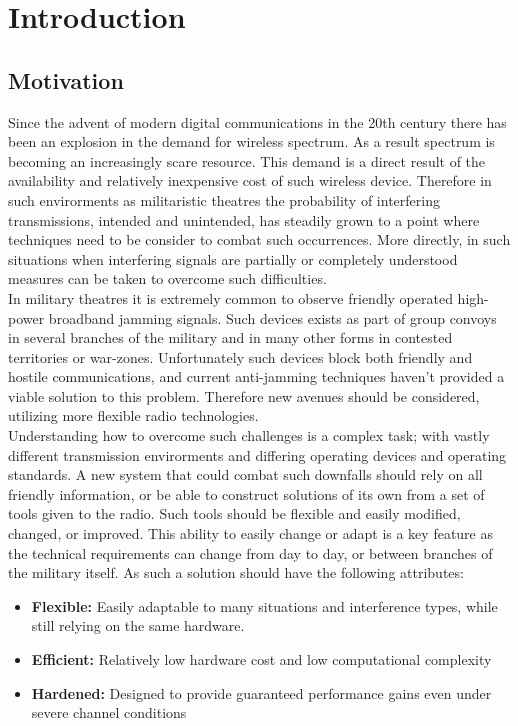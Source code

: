 \chapter{Introduction}
\label{ch:introduction}
\section{Motivation}

Since the advent of modern digital communications in the 20th century there has been an explosion in the demand for wireless spectrum.  As a result spectrum is becoming an increasingly scare resource\cite{scarcity}.  This demand is a direct result of the availability and relatively inexpensive cost of such wireless device.  Therefore in such envirorments as militaristic theatres the probability of interfering transmissions, intended and unintended, has steadily grown to a point where techniques need to be consider to combat such occurrences.  More directly, in such situations when interfering signals are partially or completely understood measures can be taken to overcome such difficulties.\\

In military theatres it is extremely common to observe friendly operated high-power broadband jamming signals\cite{frater}.  Such devices exists as part of group convoys in several branches of the military and in many other forms in contested territories or war-zones.  Unfortunately such devices block both friendly and hostile communications, and current anti-jamming techniques haven't provided a viable solution to this problem.  Therefore new avenues should be considered, utilizing more flexible radio technologies.\\

Understanding how to overcome such challenges is a complex task; with vastly different transmission envirorments and differing operating devices and operating standards.  A new system that could combat such downfalls should rely on all friendly information, or be able to construct solutions of its own from a set of tools given to the radio.  Such tools should be flexible and easily modified, changed, or improved.  This ability to easily change or adapt is a key feature as the technical requirements can change from day to day, or between branches of the military itself. As such a solution should have the following attributes:

\begin{itemize}
\item \textbf{Flexible:} Easily adaptable to many situations and interference types, while still relying on the same hardware.

\item \textbf{Efficient:} Relatively low hardware cost and low computational complexity

\item \textbf{Hardened:} Designed to provide guaranteed performance gains even under severe channel conditions

\end{itemize}


